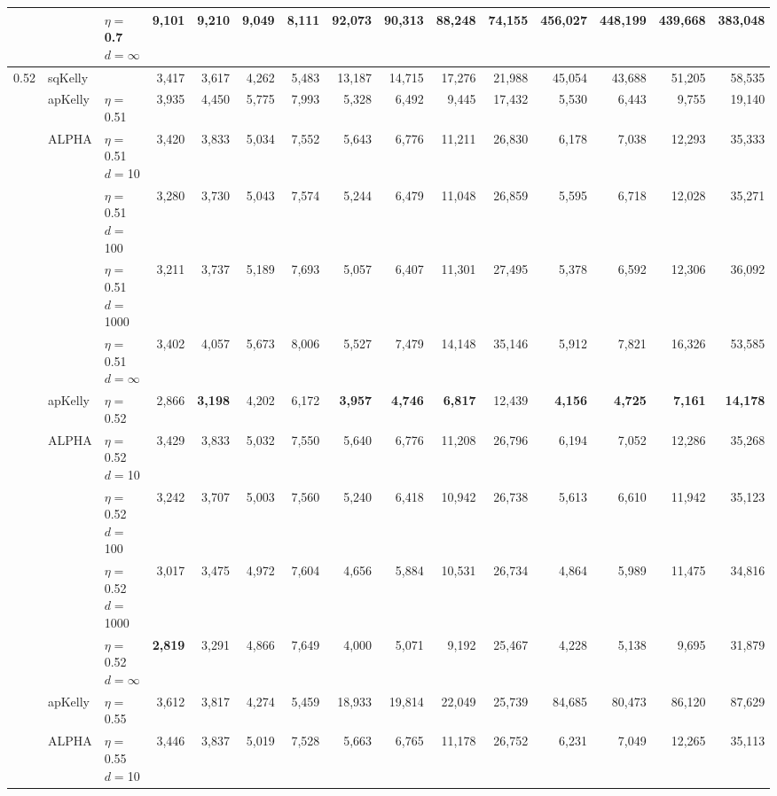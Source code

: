 \documentclass[aoas]{imsart}
\begin{document}
\begin{table}
\begin{tabular}{lll|rrrr|rrrr|rrrr}
 &  & $\eta=$0.7 $d=\infty$ & 9,101  & 9,210  & 9,049  & 8,111  & 92,073  & 90,313  & 88,248  & 74,155  & 456,027  & 448,199  & 439,668  & 383,048  \\
\hline 0.52 & sqKelly & & 3,417  & 3,617  & 4,262  & 5,483  & 13,187  & 14,715  & 17,276  & 21,988  & 45,054  & 43,688  & 51,205  & 58,535  \\
\cline{2-15} & apKelly & $\eta=$0.51 & 3,935  & 4,450  & 5,775  & 7,993  & 5,328  & 6,492  & 9,445  & 17,432  & 5,530  & 6,443  & 9,755  & 19,140  \\
\cline{2-15}
& ALPHA & $\eta=$0.51 $d=$10 & 3,420  & 3,833  & 5,034  & 7,552  & 5,643  & 6,776  & 11,211  & 26,830  & 6,178  & 7,038  & 12,293  & 35,333  \\
&  & $\eta=$0.51 $d=$100 & 3,280  & 3,730  & 5,043  & 7,574  & 5,244  & 6,479  & 11,048  & 26,859  & 5,595  & 6,718  & 12,028  & 35,271  \\
&  & $\eta=$0.51 $d=$1000 & 3,211  & 3,737  & 5,189  & 7,693  & 5,057  & 6,407  & 11,301  & 27,495  & 5,378  & 6,592  & 12,306  & 36,092  \\
 &  & $\eta=$0.51 $d=\infty$ & 3,402  & 4,057  & 5,673  & 8,006  & 5,527  & 7,479  & 14,148  & 35,146  & 5,912  & 7,821  & 16,326  & 53,585  \\
\cline{2-15} & apKelly & $\eta=$0.52 & 2,866  & \bf{3,198}  & 4,202  & 6,172  & \bf{3,957}  & \bf{4,746}  & \bf{6,817}  & 12,439  & \bf{4,156}  & \bf{4,725}  & \bf{7,161}  & \bf{14,178}  \\
\cline{2-15}
& ALPHA & $\eta=$0.52 $d=$10 & 3,429  & 3,833  & 5,032  & 7,550  & 5,640  & 6,776  & 11,208  & 26,796  & 6,194  & 7,052  & 12,286  & 35,268  \\
&  & $\eta=$0.52 $d=$100 & 3,242  & 3,707  & 5,003  & 7,560  & 5,240  & 6,418  & 10,942  & 26,738  & 5,613  & 6,610  & 11,942  & 35,123  \\
&  & $\eta=$0.52 $d=$1000 & 3,017  & 3,475  & 4,972  & 7,604  & 4,656  & 5,884  & 10,531  & 26,734  & 4,864  & 5,989  & 11,475  & 34,816  \\
 &  & $\eta=$0.52 $d=\infty$ & \bf{2,819}  & 3,291  & 4,866  & 7,649  & 4,000  & 5,071  & 9,192  & 25,467  & 4,228  & 5,138  & 9,695  & 31,879  \\
\cline{2-15} & apKelly & $\eta=$0.55 & 3,612  & 3,817  & 4,274  & 5,459  & 18,933  & 19,814  & 22,049  & 25,739  & 84,685  & 80,473  & 86,120  & 87,629  \\
\cline{2-15}
& ALPHA & $\eta=$0.55 $d=$10 & 3,446  & 3,837  & 5,019  & 7,528  & 5,663  & 6,765  & 11,178  & 26,752  & 6,231  & 7,049  & 12,265  & 35,113  \\

\end{tabular}
\end{table}
\end{document}
